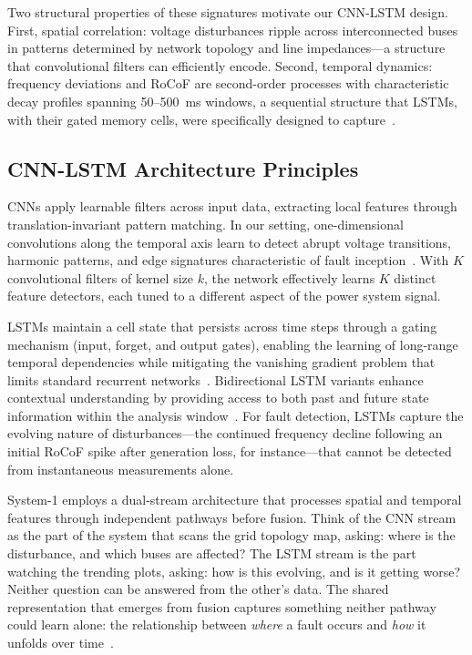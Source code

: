 \documentclass[journal]{IEEEtran}
\begin{document}
Two structural properties of these signatures motivate our CNN-LSTM design. First, spatial correlation: voltage disturbances ripple across interconnected buses in patterns determined by network topology and line impedances---a structure that convolutional filters can efficiently encode. Second, temporal dynamics: frequency deviations and RoCoF are second-order processes with characteristic decay profiles spanning 50--500~ms windows, a sequential structure that LSTMs, with their gated memory cells, were specifically designed to capture~\cite{ref10,ref21}.

\subsection{CNN-LSTM Architecture Principles}

CNNs apply learnable filters across input data, extracting local features through translation-invariant pattern matching. In our setting, one-dimensional convolutions along the temporal axis learn to detect abrupt voltage transitions, harmonic patterns, and edge signatures characteristic of fault inception~\cite{ref9}. With $K$ convolutional filters of kernel size $k$, the network effectively learns $K$ distinct feature detectors, each tuned to a different aspect of the power system signal.

LSTMs maintain a cell state that persists across time steps through a gating mechanism (input, forget, and output gates), enabling the learning of long-range temporal dependencies while mitigating the vanishing gradient problem that limits standard recurrent networks~\cite{ref10}. Bidirectional LSTM variants enhance contextual understanding by providing access to both past and future state information within the analysis window~\cite{ref22}. For fault detection, LSTMs capture the evolving nature of disturbances---the continued frequency decline following an initial RoCoF spike after generation loss, for instance---that cannot be detected from instantaneous measurements alone.

System-1 employs a dual-stream architecture that processes spatial and temporal features through independent pathways before fusion. Think of the CNN stream as the part of the system that scans the grid topology map, asking: where is the disturbance, and which buses are affected? The LSTM stream is the part watching the trending plots, asking: how is this evolving, and is it getting worse? Neither question can be answered from the other's data. The shared representation that emerges from fusion captures something neither pathway could learn alone: the relationship between \emph{where} a fault occurs and \emph{how} it unfolds over time~\cite{ref11}.
\end{document}
